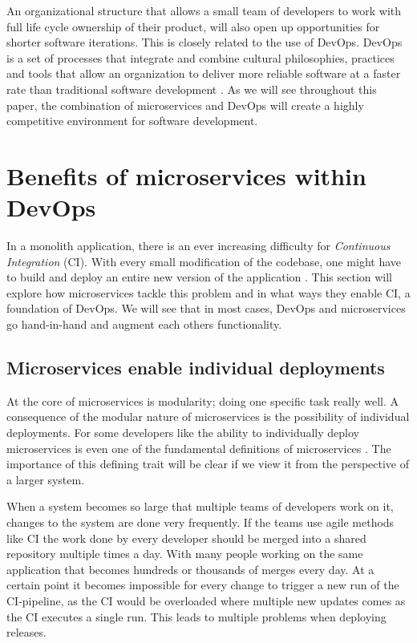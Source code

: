 \documentclass[a4paper]{article}
\begin{document}
An organizational structure that allows a small team of developers to work with full life cycle ownership of their product, will also open up opportunities for shorter software iterations. This is closely related to the use of DevOps. DevOps is a set of processes that integrate and combine cultural philosophies, practices and tools that allow an organization to deliver more reliable software at a faster rate than traditional software development \cite{aws}. As we will see throughout this paper, the combination of microservices and DevOps will create a highly competitive environment for software development.


\section{Benefits of microservices within DevOps}
\label{sec:benefits}
In a monolith application, there is an ever increasing difficulty for \textit{Continuous Integration} (CI). With every small modification of the codebase, one might have to build and deploy an entire new version of the application \cite{Jeremiah}. This section will explore how microservices tackle this problem and in what ways they enable CI, a foundation of DevOps. We will see that in most cases, DevOps and microservices go hand-in-hand and augment each others functionality.

\subsection{Microservices enable individual deployments}
At the core of microservices is modularity; doing one specific task really well. A consequence of the modular nature of microservices is the possibility of individual deployments. For some developers like \citeauthor{Newman2015} the ability to individually deploy microservices is even one of the fundamental definitions of microservices \cite{Newman2015}. The importance of this defining trait will be clear if we view it from the perspective of a larger system.

When a system becomes so large that multiple teams of developers work on it, changes to the system are done very frequently. If the teams use agile methods like CI the work done by every developer should be merged into a shared repository multiple times a day. With many people working on the same application that becomes hundreds or thousands of merges every day. At a certain point it becomes impossible for every change to trigger a new run of the CI-pipeline, as the CI would be overloaded where multiple new updates comes as the CI executes a single run. This leads to multiple problems when deploying releases.
\end{document}
